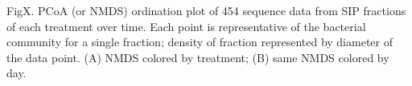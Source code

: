 FigX.  PCoA (or NMDS) ordination plot of 454 sequence data from SIP fractions of each treatment over time.  Each point is representative of the bacterial community for a single fraction; density of fraction represented by diameter of the data point.  (A) NMDS colored by treatment; (B) same NMDS colored by day.    